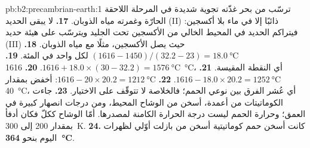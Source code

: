 \begin{solution}{pb:b2:precambrian-earth:1}
ترسّب من بحر غذّته تجوية شديدة في المرحلة اللاحقة الحارّة وغمرته
مياه الذوبان.
\textbf{17.} لا يبقى الحديد (II) ذائبًا إلا في ماء بلا أكسجين: فيتراكم الحديد في
المحيط الخالي من الأكسجين تحت الجليد ويترسّب على هيئة حديد (III) حيث يصل الأكسجين، مثلًا مع
مياه الذوبان.
\textbf{18.} $(1616 - 1450)/(32.2 - 23) = \qty{18.0}{\celsius}$ لكل واحد في المئة.
\textbf{19.} $1616 + 18.0\times(30 - 32.2) = \qty{1576}{\celsius}$.
\textbf{20.} \qty{1616}{\celsius}، أي النقطة المقيسة.
\textbf{21.} $1616 - 18.0\times20.2 = \qty{1252}{\celsius}$.
\textbf{22.} $1616 - 20\times20.2 = \qty{1212}{\celsius}$: أخفض بمقدار \qty{40}{\celsius}، أي عُشر
الفرق بين نوعي الحمم؛ فالخلاصة لا تتوقّف على الاختيار.
\textbf{23.} جاءت الكوماتيتات من أعمدة، أسخن من الوشاح المحيط، ومن درجات انصهار كبيرة
في العمق؛ وحرارة الحمم ليست درجة الحرارة الكامنة لمصدرها. أمّا
الوشاح ككلّ فكان أدفأ بمقدار 200 إلى \qty{300}{K}.
\textbf{24.} كانت أسخن حمم كوماتيتية أسخن من بازلت أوّلي لظهرات اليوم بنحو
\textbf{\qty{364}{\celsius}}.
\end{solution}
